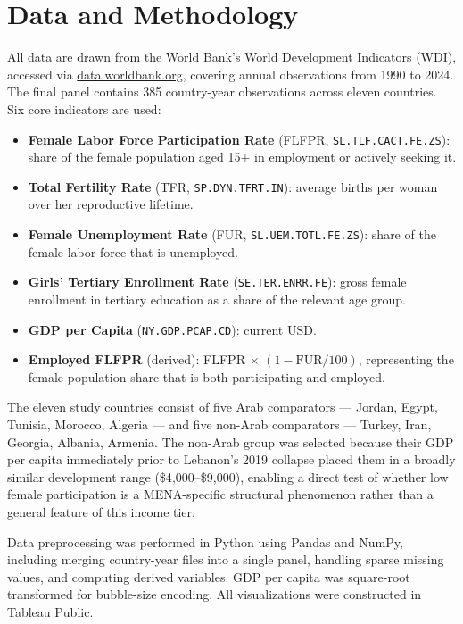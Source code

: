 \documentclass[12pt,a4paper]{article}
\begin{document}
\section{Data and Methodology}
\label{sec:data}

All data are drawn from the World Bank's World Development Indicators (WDI), accessed via \url{data.worldbank.org}, covering annual observations from 1990 to 2024. The final panel contains 385 country-year observations across eleven countries. Six core indicators are used:

\begin{itemize}[noitemsep]
  \item \textbf{Female Labor Force Participation Rate} (FLFPR, \texttt{SL.TLF.CACT.FE.ZS}): share of the female population aged 15+ in employment or actively seeking it.
  \item \textbf{Total Fertility Rate} (TFR, \texttt{SP.DYN.TFRT.IN}): average births per woman over her reproductive lifetime.
  \item \textbf{Female Unemployment Rate} (FUR, \texttt{SL.UEM.TOTL.FE.ZS}): share of the female labor force that is unemployed.
  \item \textbf{Girls' Tertiary Enrollment Rate} (\texttt{SE.TER.ENRR.FE}): gross female enrollment in tertiary education as a share of the relevant age group.
  \item \textbf{GDP per Capita} (\texttt{NY.GDP.PCAP.CD}): current USD.
  \item \textbf{Employed FLFPR} (derived): FLFPR $\times$ $(1 - \text{FUR}/100)$, representing the female population share that is both participating and employed.
\end{itemize}

The eleven study countries consist of five Arab comparators --- Jordan, Egypt, Tunisia, Morocco, Algeria --- and five non-Arab comparators --- Turkey, Iran, Georgia, Albania, Armenia. The non-Arab group was selected because their GDP per capita immediately prior to Lebanon's 2019 collapse placed them in a broadly similar development range (\$4{,}000--\$9{,}000), enabling a direct test of whether low female participation is a MENA-specific structural phenomenon rather than a general feature of this income tier.

Data preprocessing was performed in Python using Pandas and NumPy, including merging country-year files into a single panel, handling sparse missing values, and computing derived variables. GDP per capita was square-root transformed for bubble-size encoding. All visualizations were constructed in Tableau Public.
\end{document}
